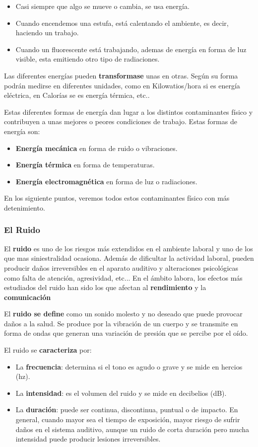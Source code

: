 \begin{itemize}
    \item Casi siempre que algo se mueve o cambia, se usa energía.
    \item Cuando encendemos una estufa, está calentando el ambiente, es decir, haciendo un trabajo.
    \item Cuando un fluorescente está trabajando, ademas de energía en forma de luz visible, esta emitiendo otro tipo de radiaciones.
\end{itemize}

Las diferentes energías pueden \textbf{transformase} unas en otras. Según su forma podrán medirse en diferentes unidades, como en Kilowatios/hora si es energía eléctrica, en Calorías se es energía térmica, etc..

Estas diferentes formas de energía dan lugar a los distintos contaminantes físico y contribuyen a unas mejores o peores condiciones de trabajo. Estas formas de energía son:

\begin{itemize}
    \item \textbf{Energía mecánica} en forma de ruido o vibraciones.
    \item \textbf{Energía térmica} en forma de temperaturas.
    \item \textbf{Energía electromagnética} en forma de luz o radiaciones.
\end{itemize}

En los siguiente puntos, veremos todos estos contaminantes físico con más detenimiento.

\subsubsection{El Ruido}
El \textbf{ruido} es uno de los riesgos más extendidos en el ambiente laboral y uno de los que mas siniestralidad ocasiona. Además de dificultar la actividad laboral, pueden producir daños irreversibles en el aparato auditivo y alteraciones psicológicas como falta de atención, agresividad, etc... En el ámbito labora, los efectos más estudiados del ruido han sido los que afectan al \textbf{rendimiento} y la \textbf{comunicación}

El \textbf{ruido se define} como un sonido molesto y no deseado que puede provocar daños a la salud. Se produce por la vibración de un cuerpo y se transmite en forma de ondas que generan una variación de presión que se percibe por el oído.

El ruido se \textbf{caracteriza} por:
\begin{itemize}
    \item La \textbf{frecuencia}: determina si el tono es agudo o grave y se mide en hercios (hz).
    \item La \textbf{intensidad}: es el volumen del ruido y se mide en decibelios (dB).
    \item La \textbf{duración}: puede ser continua, discontinua, puntual o de impacto. En general, cuando mayor sea el tiempo de exposición, mayor riesgo de sufrir daños en el sistema auditivo, aunque un ruido de corta duración pero mucha intensidad puede producir lesiones irreversibles.
\end{itemize}

